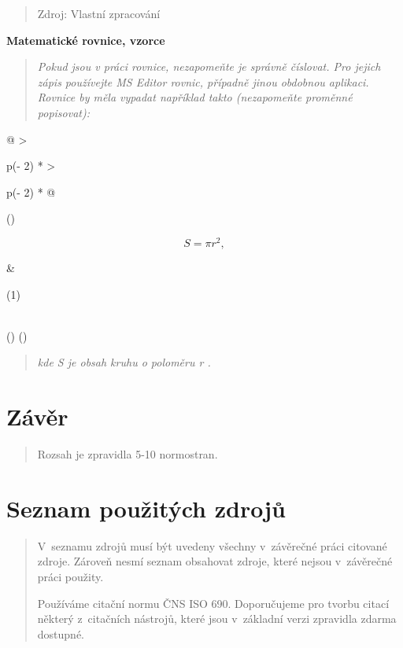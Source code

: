 \documentclass[
]{article}
\begin{document}
\begin{quote}
Zdroj: Vlastní zpracování
\end{quote}

\textbf{Matematické rovnice, vzorce}

\begin{quote}
\emph{Pokud jsou v práci rovnice, nezapomeňte je správně číslovat. Pro
jejich zápis používejte MS Editor rovnic, případně jinou obdobnou
aplikaci. Rovnice by měla vypadat například takto (nezapomeňte proměnné
popisovat):}
\end{quote}

\begin{longtable}[]{@{}
  >{\raggedright\arraybackslash}p{(\columnwidth - 2\tabcolsep) * }
  >{\raggedright\arraybackslash}p{(\columnwidth - 2\tabcolsep) * }@{}}
\toprule()
\begin{minipage}[b]{\linewidth}\raggedright
\[S = \pi r^{2},\]
\end{minipage} & \begin{minipage}[b]{\linewidth}\raggedright
(1)
\end{minipage} \\
\midrule()
\endhead
\bottomrule()
\end{longtable}

\begin{quote}
\emph{kde S je obsah kruhu o poloměru r .}
\end{quote}

\newpage
\hypertarget{zuxe1vux11br}{%
\section{Závěr}\label{zuxe1vux11br}}

\begin{quote}
Rozsah je zpravidla 5-10 normostran.
\end{quote}

\newpage
\hypertarget{seznam-pouux17eituxfdch-zdrojux16f}{%
\section{Seznam použitých
zdrojů}\label{seznam-pouux17eituxfdch-zdrojux16f}}

\begin{quote}
V~seznamu zdrojů musí být uvedeny všechny v~závěrečné práci citované
zdroje. Zároveň nesmí seznam obsahovat zdroje, které nejsou v~závěrečné
práci použity.

Používáme citační normu ČNS ISO 690. Doporučujeme pro tvorbu citací
některý z~citačních nástrojů, které jsou v~základní verzi zpravidla
zdarma dostupné.
\end{quote}
\end{document}

